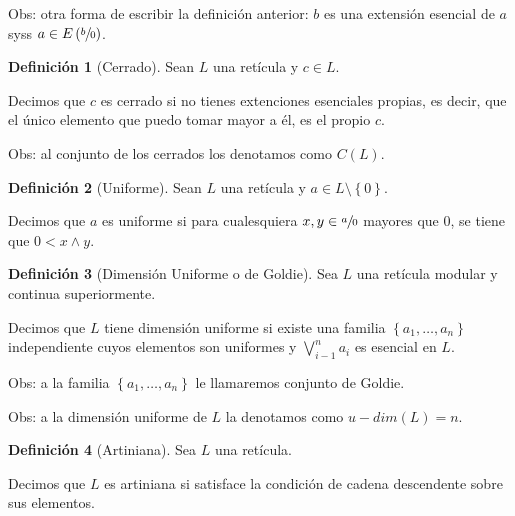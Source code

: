 \documentclass[12pt]{article}
\theoremstyle{plain}
\theoremstyle{definition}
\newtheorem{defi}{Definición}
\theoremstyle{plain}
\theoremstyle{plain}
\theoremstyle{plain}
\theoremstyle{remark}
\theoremstyle{remark}
\begin{document}
Obs: otra forma de escribir la definición anterior: $b$ es una extensión esencial de $a$ syss $a\in E\left(\sfrac{b}{0}\right)$.

\begin{defi}[Cerrado]
Sean $L$ una retícula y $c\in L$.\par
Decimos que $c$ es cerrado si no tienes extenciones esenciales propias, es decir, que el único elemento que puedo tomar mayor a él, es el propio $c$.
\end{defi}

Obs: al conjunto de los cerrados los denotamos como $C\left(L\right)$.

\begin{defi}[Uniforme]
Sean $L$ una retícula y $a\in L\setminus\left\{0\right\}$.\par
Decimos que $a$ es uniforme si para cualesquiera $x,y\in\sfrac{a}{0}$ mayores que $0$, se tiene que $0<x\wedge y$.
\end{defi}

\begin{defi}[Dimensión Uniforme o de Goldie]
Sea $L$ una retícula modular y continua superiormente.\par
Decimos que $L$ tiene dimensión uniforme si existe una familia $\left\{a_1,\dots, a_n\right\}$ independiente cuyos elementos son uniformes y $\bigvee\limits^n_{i-1}a_i$ es esencial en $L$.
\end{defi}

Obs: a la familia $\left\{a_1,\dots, a_n\right\}$ le llamaremos conjunto de Goldie.\par
Obs: a la dimensión uniforme de $L$ la denotamos como $u-dim\left(L\right)=n$.

\begin{defi}[Artiniana]
Sea $L$ una retícula.\par
Decimos que $L$ es artiniana si satisface la condición de cadena descendente sobre sus elementos.
\end{defi}

















\clearpage
\end{document}
